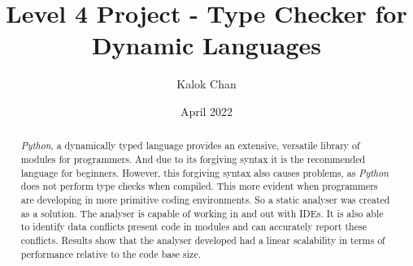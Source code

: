 \documentclass{l4proj}
\begin{document}
\title{Level 4 Project - Type Checker for Dynamic Languages}
\author{Kalok Chan}
\date{April 2022}

\maketitle

\begin{abstract}
\emph{Python}, a dynamically typed language provides an extensive, versatile library of modules for programmers. And due to its forgiving syntax it is the recommended language for beginners. However, this forgiving syntax also causes problems, as \emph{Python} does not perform type checks when compiled. This more evident when programmers are developing in more primitive coding environments. So a static analyser was created as a solution. The analyser is capable of working in and out with IDEs. It is also able to identify data conflicts present code in modules and can accurately report these conflicts. Results show that the analyser developed had a linear scalability in terms of performance relative to the code base size.
\end{abstract}


%
%
%
\educationalconsent


\tableofcontents
\end{document}
